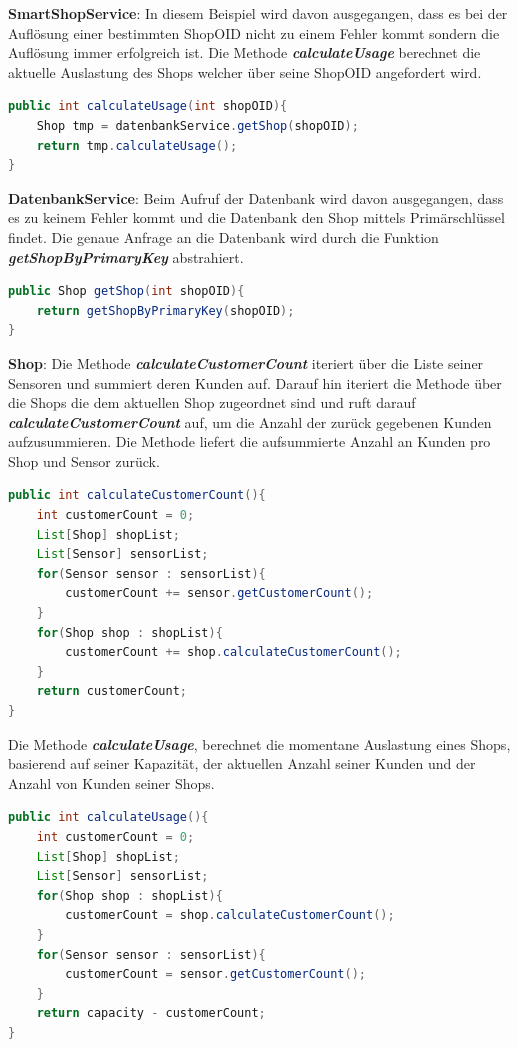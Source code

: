 \documentclass[runningheads]{llncs}
\begin{document}
\textbf{SmartShopService}: In diesem Beispiel wird davon ausgegangen, dass es bei der Auflösung einer bestimmten ShopOID nicht zu einem Fehler kommt sondern die Auflösung immer erfolgreich ist.
Die Methode \textbf{\textit{calculateUsage}} berechnet die aktuelle Auslastung des Shops welcher über seine ShopOID angefordert wird.
\begin{lstlisting}[language=Java, basicstyle=\scriptsize]
public int calculateUsage(int shopOID){
	Shop tmp = datenbankService.getShop(shopOID);
	return tmp.calculateUsage();
}
\end{lstlisting}


\textbf{DatenbankService}: Beim Aufruf der Datenbank wird davon ausgegangen, dass es zu keinem Fehler kommt und die Datenbank den Shop mittels Primärschlüssel findet.
Die genaue Anfrage an die Datenbank wird durch die Funktion \textbf{\textit{getShopByPrimaryKey}} abstrahiert.
\begin{lstlisting}[language=Java, basicstyle=\scriptsize]
public Shop getShop(int shopOID){
	return getShopByPrimaryKey(shopOID);
}
\end{lstlisting}

\break
\textbf{Shop}: Die Methode \textbf{\textit{calculateCustomerCount}} iteriert über die Liste seiner Sensoren und summiert deren Kunden auf.
Darauf hin iteriert die Methode über die Shops die dem aktuellen Shop zugeordnet sind und ruft darauf \textbf{\textit{calculateCustomerCount}} auf, um die Anzahl der zurück gegebenen Kunden aufzusummieren.
Die Methode liefert die aufsummierte Anzahl an Kunden pro Shop und Sensor zurück.
\begin{lstlisting}[language=Java, basicstyle=\scriptsize]
public int calculateCustomerCount(){
	int customerCount = 0;
	List[Shop] shopList;
	List[Sensor] sensorList;
	for(Sensor sensor : sensorList){
		customerCount += sensor.getCustomerCount();
	}
	for(Shop shop : shopList){
		customerCount += shop.calculateCustomerCount();
	}
	return customerCount;
}
\end{lstlisting}

Die Methode \textbf{\textit{calculateUsage}}, berechnet die momentane Auslastung eines Shops, basierend auf seiner Kapazität, der aktuellen Anzahl seiner Kunden und der Anzahl von Kunden seiner Shops.
\begin{lstlisting}[language=Java, basicstyle=\scriptsize]
public int calculateUsage(){
	int customerCount = 0;
	List[Shop] shopList;
	List[Sensor] sensorList;
	for(Shop shop : shopList){
		customerCount = shop.calculateCustomerCount();
	}
	for(Sensor sensor : sensorList){
		customerCount = sensor.getCustomerCount();
	}
	return capacity - customerCount;
}
\end{lstlisting}
\end{document}
